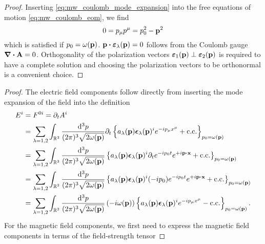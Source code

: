 \mwcoulombmodeexpansion
\begin{proof}
	Inserting \cref{eq:mw_coulomb_mode_expansion} into the free equations of motion \cref{eq:mw_coulomb_eom}, we find
	\begin{equation*}
		0
		=
		p_\mu p^\mu
		=
		p_0^2
		-
		\vb{p}^2
	\end{equation*}
	which is satisfied if $p_0=\omega(\vb{p})$.
	$\vb{p}\vdot\boldsymbol{\varepsilon}_\lambda(\vb{p})=0$ follows from the Coulomb gauge $\div\vb{A}=0$.
	Orthogonality of the polarization vectors $\boldsymbol{\varepsilon}_1(\vb{p})\perp\boldsymbol{\varepsilon}_2(\vb{p})$ is required to have a complete solution and choosing the polarization vectors to be orthonormal is a convenient choice.
\end{proof}
\mwcoulombmodeexpansionemfield
\begin{proof}
	The electric field components follow directly from inserting the mode expansion of the field into the definition
	\begin{equation*}
		\begin{split}
			E^i
			&=
			F^{0i}
			=
			\partial_t
			A^i
			\\
			&=
			\sum_{\lambda=1,2}
			\int_{\mathbb{R}^3}\frac{\dd[3]{p}}{(2\pi)^3\sqrt{2\omega(\vb{p})}}
			\partial_t
			\left\{
				a_\lambda(\vb{p})
				\boldsymbol{\epsilon}_\lambda(\vb{p})^i
				e^{-ip_\mu x^\mu}
				+
				\text{c.c.}
			\right\}_{p_0=\omega(\vb{p})}
			\\
			&=
			\sum_{\lambda=1,2}
			\int_{\mathbb{R}^3}\frac{\dd[3]{p}}{(2\pi)^3\sqrt{2\omega(\vb{p})}}
			\left\{
				a_\lambda(\vb{p})
				\boldsymbol{\epsilon}_\lambda(\vb{p})^i
				\partial_t
				e^{-ip_0t}
				e^{+i\vb{p}\vdot\vb{x}}
				+
				\text{c.c.}
			\right\}_{p_0=\omega(\vb{p})}
			\\
			&=
			\sum_{\lambda=1,2}
			\int_{\mathbb{R}^3}\frac{\dd[3]{p}}{(2\pi)^3\sqrt{2\omega(\vb{p})}}
			\left\{
				a_\lambda(\vb{p})
				\boldsymbol{\epsilon}_\lambda(\vb{p})^i
				(-ip_0)
				e^{-ip_0t}
				e^{+i\vb{p}\vdot\vb{x}}
				+
				\text{c.c.}
			\right\}_{p_0=\omega(\vb{p})}
			\\
			&=
			\sum_{\lambda=1,2}
			\int_{\mathbb{R}^3}\frac{\dd[3]{p}}{(2\pi)^3\sqrt{2\omega(\vb{p})}}
			\left(-i\omega(\vb{p})\right)
			\left\{
				a_\lambda(\vb{p})
				\boldsymbol{\epsilon}_\lambda(\vb{p})^i
				e^{-ip_\mu x^\mu}
				-
				\text{c.c.}
			\right\}_{p_0=\omega(\vb{p})}
			.
		\end{split}
	\end{equation*}
	For the magnetic field components, we first need to express the magnetic field components in terms of the field-strength tensor

\end{proof}
